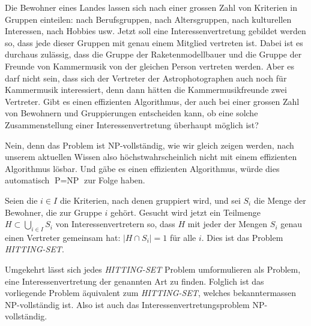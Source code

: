 Die Bewohner eines Landes lassen sich nach einer grossen Zahl
von Kriterien in Gruppen einteilen: nach Berufsgruppen, nach
Altersgruppen, nach kulturellen Interessen, nach Hobbies usw.
Jetzt soll eine Interessenvertretung gebildet werden so, dass
jede dieser Gruppen mit genau einem Mitglied vertreten ist.
Dabei ist es durchaus zulässig, dass die Gruppe der Raketenmodellbauer
und die Gruppe der Freunde von Kammermusik von der gleichen Person
vertreten werden. Aber es darf nicht sein, dass sich der Vertreter
der Astrophotographen auch noch für Kammermusik interessiert, denn
dann hätten die Kammermusikfreunde zwei Vertreter.
Gibt es einen effizienten Algorithmus, der auch bei einer grossen
Zahl von Bewohnern und Gruppierungen entscheiden kann, ob eine
solche Zusammenstellung einer Interessenvertretung überhaupt
möglich ist?


\begin{loesung}
Nein, denn das Problem ist NP-vollständig, wie wir gleich
zeigen werden, nach unserem aktuellen
Wissen also höchstwahrscheinlich nicht mit einem effizienten
Algorithmus lösbar. Und gäbe es einen effizienten Algorithmus,
würde dies automatisch $\text{P}=\text{NP}$ zur Folge haben.

Seien die $i\in I$ die Kriterien, nach denen gruppiert wird,
und sei $S_i$ die Menge der Bewohner, die zur Gruppe $i$ gehört.
Gesucht wird jetzt ein Teilmenge $H\subset\bigcup_{i\in I}S_i$
von Interessenvertretern so, dass $H$ mit jeder der Mengen
$S_i$ genau einen Vertreter gemeinsam hat: $|H\cap S_i|=1$
für alle $i$. Dies ist das Problem {\textsl{HITTING-SET}}. 

Umgekehrt lässt sich jedes {\textsl{HITTING-SET}} Problem umformulieren
als Problem, eine Interessenvertretung der genannten Art zu finden.
Folglich ist das vorliegende Problem äquivalent zum {\textsl{HITTING-SET}},
welches bekanntermassen NP-vollständig ist. Also ist auch das
Interessenvertretungsproblem NP-vollständig.
\end{loesung}
